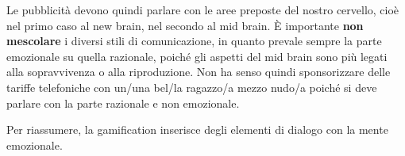 Le pubblicità devono quindi parlare con le aree preposte del nostro cervello,
cioè nel primo caso al new brain, nel secondo al mid brain. È importante
\textbf{non mescolare} i diversi stili di comunicazione, in quanto prevale
sempre la parte emozionale su quella razionale, poiché gli aspetti del mid
brain sono più legati alla sopravvivenza o alla riproduzione. Non ha senso
quindi sponsorizzare delle tariffe telefoniche con un/una bel/la ragazzo/a
mezzo nudo/a poiché si deve parlare con la parte razionale e non emozionale.

Per riassumere, la gamification inserisce degli elementi di dialogo
con la mente emozionale.